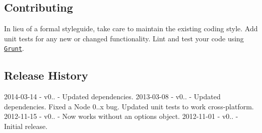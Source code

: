 \subsection*{Contributing}

In lieu of a formal styleguide, take care to maintain the existing coding style. Add unit tests for any new or changed functionality. Lint and test your code using \href{http://gruntjs.com/}{\tt Grunt}.

\subsection*{Release History}

2014-\/03-\/14 -\/ v0.. -\/ Updated dependencies. 2013-\/03-\/08 -\/ v0.. -\/ Updated dependencies. Fixed a Node 0..\+x bug. Updated unit tests to work cross-\/platform. 2012-\/11-\/15 -\/ v0.. -\/ Now works without an options object. 2012-\/11-\/01 -\/ v0.. -\/ Initial release. 